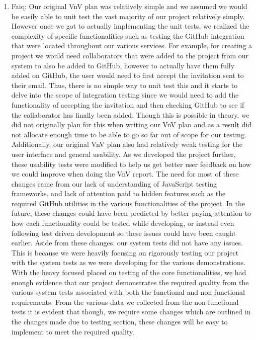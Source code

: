 \documentclass[12pt, titlepage]{article}
\begin{document}
	\begin{enumerate}
		\item Faiq: Our original VnV plan was relatively simple and we assumed we would be easily able to unit test the vast majority of our project relatively simply. However once we got to actually implementing the unit tests, we realized the complexity of specific functionalities such as testing the GitHub integration that were located throughout our various services. For example, for creating a project we would need collaborators that were added to the project from our system to also be added to GitHub, however to actually have them fully added on GitHub, the user would need to first accept the invitation sent to their email. Thus, there is no simple way to unit test this and it starts to delve into the scope of integration testing since we would need to add the functionality of accepting the invitation and then checking GitHub to see if the collaborator has finally been added. Though this is possible in theory, we did not originally plan for this when writing our VnV plan and as a result did not allocate enough time to be able to go so far out of scope for our testing. Additionally, our original VnV plan also had relatively weak testing for the user interface and general usability. As we developed the project further, these usability tests were modified to help us get better user feedback on how we could improve when doing the VnV report. The need for most of these changes came from our lack of understanding of JavaScript testing frameworks, and lack of attention paid to hidden features such as the required GitHub utilities in the various functionalities of the project. In the future, these changes could have been predicted by better paying attention to how each functionality could be tested while developing, or instead even following test driven development so these issues could have been caught earlier. Aside from these changes, our system tests did not have any issues. This is because we were heavily focusing on rigorously testing our project with the system tests as we were developing for the various demonstrations. With the heavy focused placed on testing of the core functionalities, we had enough evidence that our project demonstrates the required quality from the various system tests associated with both the functional and non functional requirements. From the various data we collected from the non functional tests it is evident that though, we require some changes which are outlined in the changes made due to testing section, these changes will be easy to implement to meet the required quality.

\end{enumerate}
\end{document}
